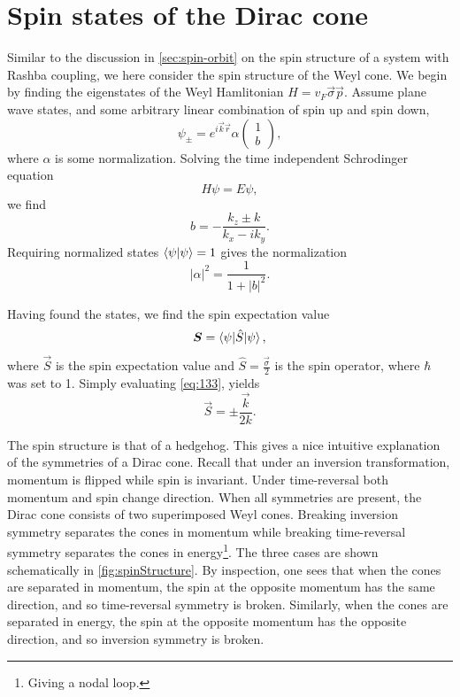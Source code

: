 \section{Spin states of the Dirac cone}
Similar to the discussion in \cref{sec:spin-orbit} on the spin structure of a system with Rashba coupling, we here consider the spin structure of the Weyl cone.
We begin by finding the eigenstates of the Weyl Hamlitonian \( H = v_F \vec{\sigma} \vec{p} \).
Assume plane wave states, and some arbitrary linear combination of spin up and spin down,
\[
  \psi _{\pm} = e^{i \vec{k} \vec{r}} \alpha
  \begin{pmatrix}
    1\\
    b
  \end{pmatrix},
\]
where \(\alpha \) is some normalization.
Solving the time independent Schrodinger equation
\[
H \psi = E \psi,
\]
we find
\begin{equation}
  \label{eq:132}
  b = -\frac{k_{z} \pm k}{k_{x} - i k_{y}}.
\end{equation}
Requiring normalized states \(\braket{\psi | \psi } = 1\) gives the normalization
\[
|\alpha |^2 = \frac{1}{1 + |b|^2}.
\]

Having found the states, we find the spin expectation value
\begin{equation}
  \label{eq:133}
  \bm{S} = \braket{\psi | \hat{S} | \psi },
\end{equation}
where \(\vec{S}\) is the spin expectation value and \(\hat{S} = \frac{\vec{\sigma}}{2} \) is the spin operator, where \(\hbar \) was set to 1.
Simply evaluating \cref{eq:133}, yields
\begin{equation}
  \label{eq:134}
  \vec{S} = \pm \frac{\vec{k}}{2 k}.
\end{equation}

The spin structure is that of a hedgehog.
This gives a nice intuitive explanation of the symmetries of a Dirac cone.
Recall that under an inversion transformation, momentum is flipped while spin is invariant.
Under time-reversal both momentum and spin change direction.
When all symmetries are present, the Dirac cone consists of two superimposed Weyl cones.
Breaking inversion symmetry separates the cones in momentum while breaking time-reversal symmetry separates the cones in energy\footnote{Giving a nodal loop.}.
The three cases are shown schematically in \cref{fig:spinStructure}.
By inspection, one sees that when the cones are separated in momentum, the spin at the opposite momentum has the same direction, and so time-reversal symmetry is broken.
Similarly, when the cones are separated in energy, the spin at the opposite momentum has the opposite direction, and so inversion symmetry is broken.


